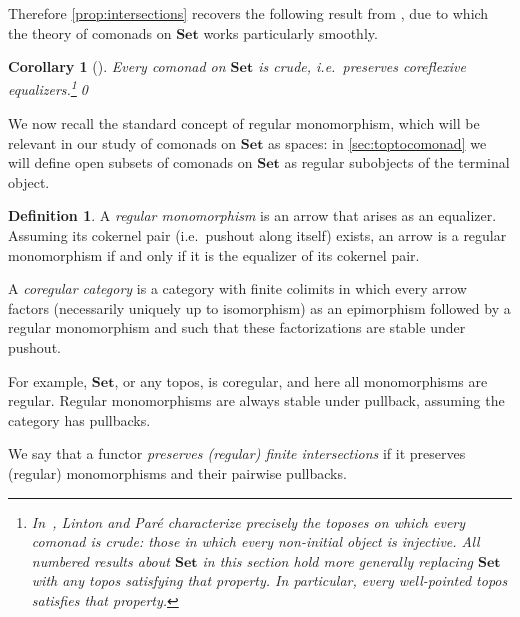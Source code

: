 \documentclass[11pt, oneside, article]{memoir}
\theoremstyle{plain}
\newtheorem{corollary}[theorem]{Corollary}
\theoremstyle{definition}
\newtheorem{definition}[def]{Definition}
\theoremstyle{remark}
\newcommand{\namedcat}[1]{\mathbf{#1}}
\newcommand{\Set}{\namedcat{Set}}
\begin{document}
Therefore \cref{prop:intersections} recovers the following result from
\cite{linton-pare}, due to which the theory of comonads on $\Set$
works particularly smoothly.

\begin{corollary}[{\cite{linton-pare}}]\label{lem:corefl}
  Every comonad on $\Set$ is crude, i.e.\ preserves coreflexive
  equalizers.\footnote{In~\cite{linton-pare}, Linton and Par{\'e}
    characterize precisely the toposes on which every comonad is
    crude: those in which every non-initial object is injective. All
    numbered results about $\Set$ in this section hold more generally
    replacing $\Set$ with any topos satisfying that property. In
    particular, every well-pointed topos satisfies that property.}\qed
\end{corollary}

We now recall the standard concept of regular monomorphism, which will
be relevant in our study of comonads on $\Set$ as spaces: in
\cref{sec:toptocomonad} we will define open subsets of comonads on
$\Set$ as regular subobjects of the terminal object.

\begin{definition}\label{def:coregular}
  A \emph{regular monomorphism} is an arrow that arises as an
  equalizer. Assuming its cokernel pair (i.e.\ pushout along itself)
  exists, an arrow is a regular monomorphism if and only if it is the
  equalizer of its cokernel pair.

  A \emph{coregular category} is a category with finite colimits in
  which every arrow factors (necessarily uniquely up to isomorphism)
  as an epimorphism followed by a regular monomorphism and such that
  these factorizations are stable under pushout.
\end{definition}

For example, $\Set$, or any topos, is coregular, and here all
monomorphisms are regular. Regular monomorphisms are always stable
under pullback, assuming the category has pullbacks.

We say that a functor \emph{preserves (regular) finite intersections}
if it preserves (regular) monomorphisms and their pairwise pullbacks.
\end{document}
